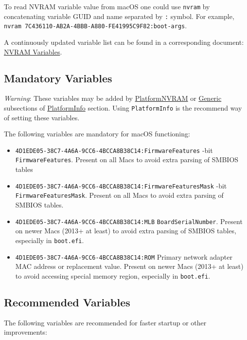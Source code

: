 \documentclass[]{article}
\providecommand{\tightlist}{%
  \setlength{\itemsep}{0pt}\setlength{\parskip}{0pt}}
\begin{document}
To read NVRAM variable value from macOS one could use \texttt{nvram}
by concatenating variable GUID and name separated by \texttt{:} symbol.
For example, \texttt{nvram 7C436110-AB2A-4BBB-A880-FE41995C9F82:boot-args}.

A continuously updated variable list can be found in a corresponding document:
\href{https://docs.google.com/spreadsheets/d/1HTCBwfOBkXsHiK7os3b2CUc6k68axdJYdGl-TyXqLu0}{NVRAM Variables}.

\subsection{Mandatory Variables}\label{nvramvars}

\emph{Warning}: These variables may be added by
\hyperref[platforminfonvram]{PlatformNVRAM} or
\hyperref[platforminfogeneric]{Generic} subsections of
\hyperref[platforminfo]{PlatformInfo} section.
Using \texttt{PlatformInfo} is the recommend way of setting these variables.

The following variables are mandatory for macOS functioning:

\begin{itemize}
\tightlist
\item
  \texttt{4D1EDE05-38C7-4A6A-9CC6-4BCCA8B38C14:FirmwareFeatures}
  -bit \texttt{FirmwareFeatures}. Present on all Macs to avoid extra parsing of SMBIOS tables
\item
  \texttt{4D1EDE05-38C7-4A6A-9CC6-4BCCA8B38C14:FirmwareFeaturesMask}
  -bit \texttt{FirmwareFeaturesMask}. Present on all Macs to avoid extra parsing
  of SMBIOS tables.
\item
  \texttt{4D1EDE05-38C7-4A6A-9CC6-4BCCA8B38C14:MLB}
  \break
  \texttt{BoardSerialNumber}. Present on newer Macs (2013+ at least) to avoid extra parsing
  of SMBIOS tables, especially in \texttt{boot.efi}.
\item
  \texttt{4D1EDE05-38C7-4A6A-9CC6-4BCCA8B38C14:ROM}
  \break
  Primary network adapter MAC address or replacement value. Present on newer Macs
  (2013+ at least) to avoid accessing special memory region, especially in \texttt{boot.efi}.
\end{itemize}

\subsection{Recommended Variables}\label{nvramvarsrec}

The following variables are recommended for faster startup or other
improvements:
\end{document}
